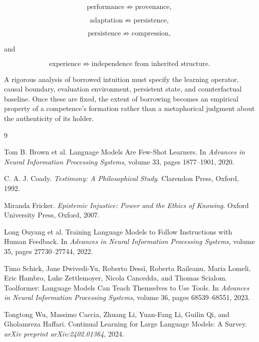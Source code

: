 \documentclass[11pt]{article}
\begin{document}
\[
\text{performance}
\not\Rightarrow
\text{provenance},
\]

\[
\text{adaptation}
\not\Rightarrow
\text{persistence},
\]

\[
\text{persistence}
\not\Rightarrow
\text{compression},
\]

and

\[
\text{experience}
\not\Rightarrow
\text{independence from inherited structure}.
\]

A rigorous analysis of borrowed intuition must specify the learning operator, causal boundary, evaluation environment, persistent state, and counterfactual baseline. Once these are fixed, the extent of borrowing becomes an empirical property of a competence's formation rather than a metaphorical judgment about the authenticity of its holder.

\newpage

\begin{thebibliography}{9}

Tom B. Brown et al.
\newblock Language Models Are Few-Shot Learners.
\newblock In \emph{Advances in Neural Information Processing Systems}, volume 33, pages 1877--1901, 2020.

C. A. J. Coady.
\newblock \emph{Testimony: A Philosophical Study}.
\newblock Clarendon Press, Oxford, 1992.

Miranda Fricker.
\newblock \emph{Epistemic Injustice: Power and the Ethics of Knowing}.
\newblock Oxford University Press, Oxford, 2007.

Long Ouyang et al.
\newblock Training Language Models to Follow Instructions with Human Feedback.
\newblock In \emph{Advances in Neural Information Processing Systems}, volume 35, pages 27730--27744, 2022.

Timo Schick, Jane Dwivedi-Yu, Roberto Dess\`i, Roberta Raileanu,
Maria Lomeli, Eric Hambro, Luke Zettlemoyer, Nicola Cancedda,
and Thomas Scialom.
\newblock Toolformer: Language Models Can Teach Themselves to Use Tools.
\newblock In \emph{Advances in Neural Information Processing Systems}, volume 36, pages 68539--68551, 2023.

Tongtong Wu, Massimo Caccia, Zhuang Li, Yuan-Fang Li,
Guilin Qi, and Gholamreza Haffari.
\newblock Continual Learning for Large Language Models: A Survey.
\newblock \emph{arXiv preprint arXiv:2402.01364}, 2024.

\end{thebibliography}
\end{document}
